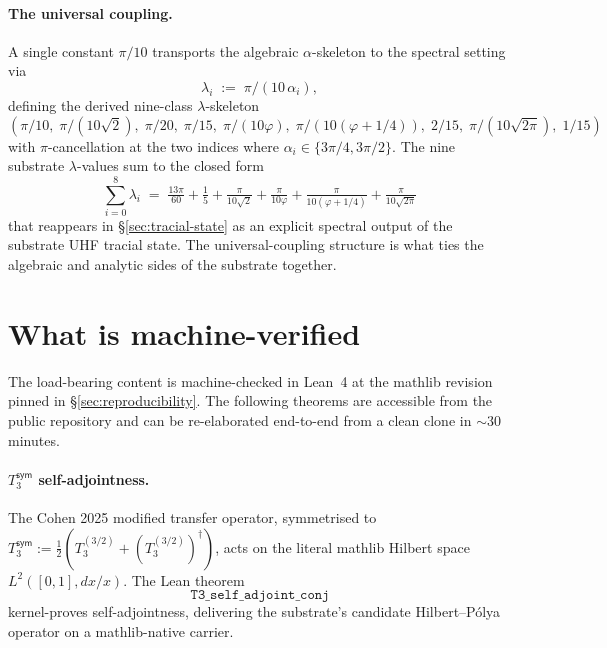\documentclass[11pt,a4paper]{amsart}
\theoremstyle{plain}
\theoremstyle{definition}
\begin{document}
\paragraph{The universal coupling.} A single constant $\pi/10$ transports the algebraic $\alpha$-skeleton to the spectral setting via
\[
\lambda_i \;:=\; \pi / (10 \, \alpha_i),
\]
defining the derived nine-class $\lambda$-skeleton
\[
(\pi/10,\; \pi/(10\sqrt{2}),\; \pi/20,\; \pi/15,\; \pi/(10\varphi),\; \pi/(10(\varphi+1/4)),\; 2/15,\; \pi/(10\sqrt{2\pi}),\; 1/15)
\]
with $\pi$-cancellation at the two indices where $\alpha_i \in \{3\pi/4, 3\pi/2\}$. The nine substrate $\lambda$-values sum to the closed form
\[
\sum_{i=0}^{8} \lambda_i \;=\; \tfrac{13\pi}{60} + \tfrac{1}{5} + \tfrac{\pi}{10\sqrt{2}} + \tfrac{\pi}{10\varphi} + \tfrac{\pi}{10(\varphi+1/4)} + \tfrac{\pi}{10\sqrt{2\pi}}
\]
that reappears in \S\ref{sec:tracial-state} as an explicit spectral output of the substrate UHF tracial state. The universal-coupling structure is what ties the algebraic and analytic sides of the substrate together.

\section{What is machine-verified}\label{sec:kernel-verified}

The load-bearing content is machine-checked in Lean~4 at the mathlib revision pinned in \S\ref{sec:reproducibility}. The following theorems are accessible from the public repository and can be re-elaborated end-to-end from a clean clone in $\sim 30$ minutes.

\paragraph{$T_3^{\textsf{sym}}$ self-adjointness.} The Cohen 2025 modified transfer operator, symmetrised to $T_3^{\textsf{sym}} := \tfrac{1}{2}(T_3^{(3/2)} + (T_3^{(3/2)})^\dagger)$, acts on the literal mathlib Hilbert space $L^2([0,1], dx/x)$. The Lean theorem
\[
\texttt{T3\_self\_adjoint\_conj}
\]
kernel-proves self-adjointness, delivering the substrate's candidate Hilbert--P\'olya operator on a mathlib-native carrier.
\end{document}
